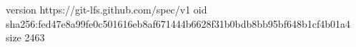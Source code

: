 version https://git-lfs.github.com/spec/v1
oid sha256:fed47e8a99fe0c501616eb8af671444b6628f31b0bdb8bb95bf648b1cf4b01a4
size 2463
